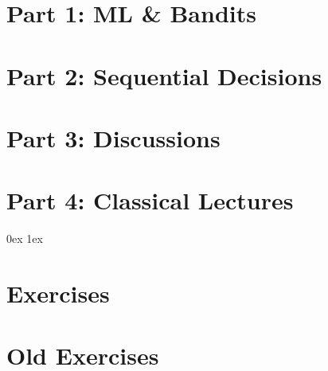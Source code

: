 \clearpage
\section{Part 1: ML \& Bandits}





\clearpage
\section{Part 2: Sequential Decisions}



%


\clearpage
\section{Part 3: Discussions}



\clearpage
\section{Part 4: Classical Lectures}











\clearpage
\fancyhfoffset{0mm}
\parindent 0ex
\parskip 1ex

\DefineShortVerb{\@}

\section{Exercises}








\section{Old Exercises}










